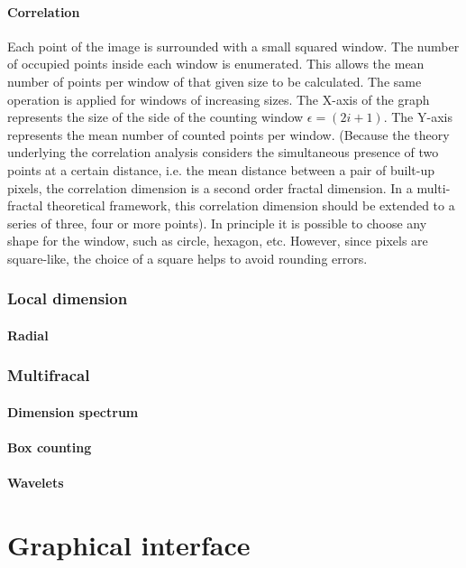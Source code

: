 \documentclass[a4paper,10pt]{report}
\begin{document}
\subsection{Correlation}
Each point of the image is surrounded with a small squared window. The number of occupied points inside each window is enumerated. This allows the mean number of points per window of that given size to be calculated. The same operation is applied for windows of increasing sizes. The X-axis of the graph represents the size of the side of the counting window $\epsilon = (2i+1)$. The Y-axis represents the mean number of counted points per window. (Because the theory underlying the correlation analysis considers the simultaneous presence of two points at a certain distance, i.e. the mean distance between a pair of built-up pixels, the correlation dimension is a second order fractal dimension. In a multi-fractal theoretical framework, this correlation dimension should be extended to a series of three, four or more points). In principle it is possible to choose any shape for the window, such as circle, hexagon, etc. However, since pixels are square-like, the choice of a square helps to avoid rounding errors.

\section{Local dimension}
\subsection{Radial}

\section{Multifracal}
\subsection{Dimension spectrum}
\subsection{Box counting}
\subsection{Wavelets}


\part{Graphical interface}
\end{document}
